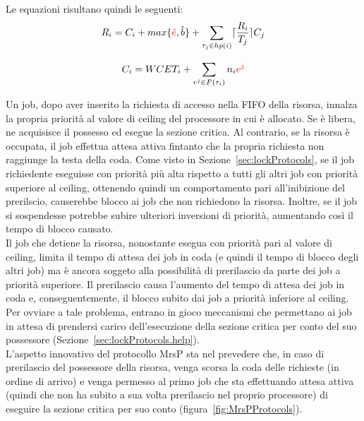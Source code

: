 Le equazioni risultano quindi le seguenti:\\

\begin{equation}\label{eq:R2}
R_i = C_i + max \text{\{\textcolor{red}{$\hat{e}$}},\hat{b}\} + \sum\limits_{\tau_j \in hp(i)} \lceil\frac{R_i}{T_j}\rceil C_j
\end{equation}

\begin{equation}\label{eq:C2}
C_i = WCET_i + \sum\limits_{r^j \in F(\tau_i)} n_i \text{\textcolor{red}{$e^j$}}
\end{equation}

\vspace{4 mm}

Un job, dopo aver inserito la richiesta di accesso nella FIFO della risorsa, innalza la propria priorità al valore di ceiling del processore in cui è allocato. Se è libera, ne acquisisce il possesso ed esegue la sezione critica. Al contrario, se la risorsa è occupata, il job effettua attesa attiva fintanto che la propria richiesta non raggiunge la testa della coda. Come visto in Sezione~\ref{sec:lockProtocols}, se il job richiedente eseguisse con priorità più alta rispetto a tutti gli altri job con priorità superiore al ceiling, ottenendo quindi un comportamento pari all’inibizione del prerilscio, causerebbe blocco ai job che non richiedono la risorsa. Inoltre, se il job si sospendesse potrebbe subire ulteriori inversioni di priorità, aumentando così il tempo di blocco causato.\\

Il job che detiene la risorsa, nonostante esegua con priorità pari al valore di ceiling, limita il tempo di attesa dei job in coda (e quindi il tempo di blocco degli altri job) ma è ancora soggeto alla possibilità di prerilascio da parte dei job a priorità superiore. Il prerilascio causa l'aumento del tempo di attesa dei job in coda e, conseguentemente, il blocco subito dai job a priorità inferiore al ceiling. Per ovviare a tale problema, entrano in gioco meccanismi che permettano ai job in attesa di prendersi carico dell’esecuzione della sezione critica per conto del suo possessore (Sezione~\ref{sec:lockProtocols.help}).\\

L'aspetto innovativo del protocollo MrsP sta nel prevedere che, in caso di prerilascio del possessore della risorsa, venga scorsa la coda delle richieste (in ordine di arrivo) e venga permesso al primo job che sta effettuando attesa attiva (quindi che non ha subito a sua volta prerilascio nel proprio processore) di eseguire la sezione critica per suo conto (figura~\ref{fig:MrsPProtocols}).\\

